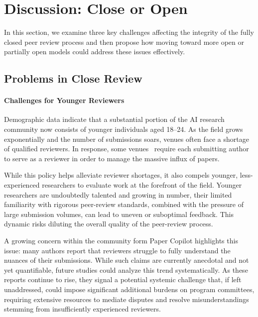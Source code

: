 \section{Discussion: Close or Open}
In this section, we examine three key challenges affecting the integrity of the fully closed peer review process and then propose how moving toward more open or partially open models could address these issues effectively.


\subsection{Problems in Close Review}

\paragraph{Challenges for Younger Reviewers}
Demographic data indicate that a substantial portion of the AI research community now consists of younger individuals aged 18–24. As the field grows exponentially and the number of submissions soars, venues often face a shortage of qualified reviewers. In response, some venues~\cite{cvpr2025changes} require each submitting author to serve as a reviewer in order to manage the massive influx of papers.

While this policy helps alleviate reviewer shortages, it also compels younger, less-experienced researchers to evaluate work at the forefront of the field. Younger researchers are undoubtedly talented and growing in number, their limited familiarity with rigorous peer-review standards, combined with the pressure of large submission volumes, can lead to uneven or suboptimal feedback. This dynamic risks diluting the overall quality of the peer-review process.

A growing concern within the community form Paper Copilot highlights this issue: many authors report that reviewers struggle to fully understand the nuances of their submissions. While such claims are currently anecdotal and not yet quantifiable, future studies could analyze this trend systematically. As these reports continue to rise, they signal a potential systemic challenge that, if left unaddressed, could impose significant additional burdens on program committees, requiring extensive resources to mediate disputes and resolve misunderstandings stemming from insufficiently experienced reviewers.


